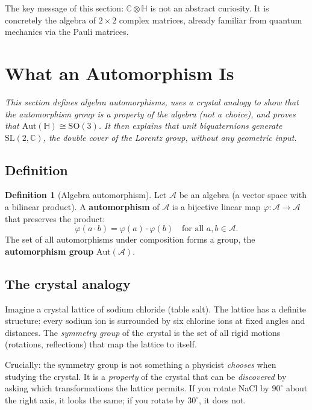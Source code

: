 \documentclass[12pt,a4paper]{article}
\theoremstyle{definition}
\newtheorem{definition}[theorem]{Definition}
\theoremstyle{remark}
\begin{document}
The key message of this section: $\mathbb{C}\otimes\mathbb{H}$ is not an
abstract curiosity.  It is concretely the algebra of $2\times 2$ complex
matrices, already familiar from quantum mechanics via the Pauli matrices.

\section{What an Automorphism Is}
\label{sec:automorphisms}

\textit{This section defines algebra automorphisms, uses a crystal analogy to
show that the automorphism group is a \emph{property} of the algebra (not a
choice), and proves that $\mathrm{Aut}(\mathbb{H})\cong\mathrm{SO}(3)$.
It then explains that unit biquaternions generate $\mathrm{SL}(2,\mathbb{C})$,
the double cover of the Lorentz group, without any geometric input.}

\subsection{Definition}

\begin{definition}[Algebra automorphism]
  Let $\mathcal{A}$ be an algebra (a vector space with a bilinear product).
  A \textbf{automorphism} of $\mathcal{A}$ is a bijective linear map
  $\varphi:\mathcal{A}\to\mathcal{A}$ that preserves the product:
  \[
    \varphi(a\cdot b) = \varphi(a)\cdot\varphi(b)
    \quad\text{for all }a,b\in\mathcal{A}.
  \]
  The set of all automorphisms under composition forms a group,
  the \textbf{automorphism group} $\mathrm{Aut}(\mathcal{A})$.
\end{definition}

\subsection{The crystal analogy}

Imagine a crystal lattice of sodium chloride (table salt).
The lattice has a definite structure: every sodium ion is surrounded by six
chlorine ions at fixed angles and distances.
The \emph{symmetry group} of the crystal is the set of all rigid motions
(rotations, reflections) that map the lattice to itself.

Crucially: the symmetry group is not something a physicist \emph{chooses}
when studying the crystal.  It is a \emph{property} of the crystal that can
be \emph{discovered} by asking which transformations the lattice permits.
If you rotate NaCl by $90^{\circ}$ about the right axis, it looks the same; if you
rotate by $30^{\circ}$, it does not.
\end{document}
